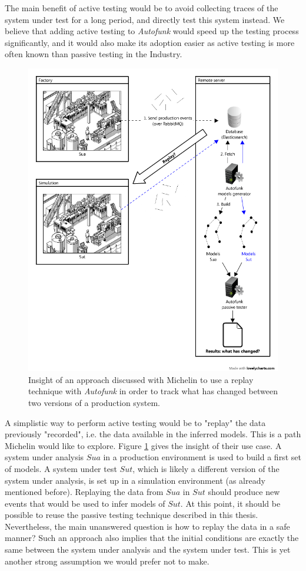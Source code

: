 The main benefit of active testing would be to avoid collecting
traces of the system under test for a long period, and directly
test this system instead. We believe that adding active testing
to \textit{Autofunk} would speed up the testing process
significantly, and it would also make its adoption easier as
active testing is more often known than passive testing in the
Industry.

\begin{figure}[ht]
    \begin{center}
        \includegraphics[width=0.8\linewidth]{figures/autofunk_active.png}
    \end{center}

    \caption{Insight of an approach discussed with Michelin to
    use a replay technique with \textit{Autofunk} in order to
    track what has changed between two versions of a production
    system.}
    \label{fig:autofunk_active}
\end{figure}

A simplistic way to perform active testing would be to "replay"
the data previously "recorded", i.e. the data available in the
inferred models. This is a path Michelin would like to explore.
Figure \ref{fig:autofunk_active} gives the insight of their use
case. A system under analysis $Sua$ in a production environment
is used to build a first set of models. A system under test
$Sut$, which is likely a different version of the system under
analysis, is set up in a simulation environment (as already
mentioned before). Replaying the data from $Sua$ in $Sut$ should
produce new events that would be used to infer models of $Sut$.
At this point, it should be possible to reuse the passive testing
technique described in this thesis. Nevertheless, the main
unanswered question is how to replay the data in a safe manner?
Such an approach also implies that the initial conditions are
exactly the same between the system under analysis and the system
under test. This is yet another strong assumption we would prefer
not to make.

